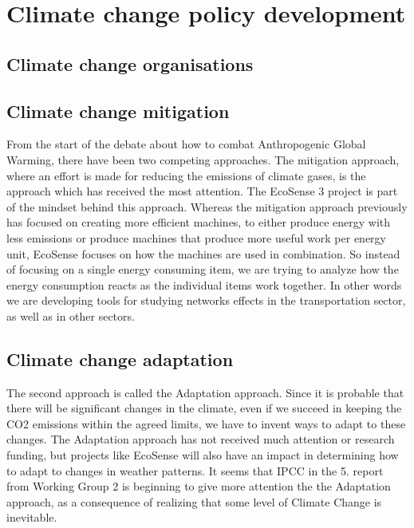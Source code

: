 \section{Climate change policy development}
\subsection{Climate change organisations}

\subsection{Climate change mitigation}From the start of the debate about how to combat Anthropogenic Global Warming, there have been two competing approaches. The mitigation approach, where an effort is made for reducing the emissions of climate gases, is the approach which has received the most attention. The EcoSense 3 project is part of the mindset behind this approach. Whereas the mitigation approach previously has focused on creating more efficient machines, to either produce energy with less emissions or produce machines that produce more useful work per energy unit, EcoSense focuses on how the machines are used in combination. So instead of focusing on a single energy consuming item, we are trying to analyze how the energy consumption reacts as the individual items work together. In other words we are developing tools for studying networks effects in the transportation sector, as well as in other sectors.


\subsection{Climate change adaptation}
The second approach is called the Adaptation approach. Since it is probable that there will be significant changes in the climate, even if we succeed in keeping the CO2 emissions within the agreed limits, we have to invent ways to adapt to these changes. The Adaptation approach has not received much attention or research funding, but projects like EcoSense will also have an impact in determining how to adapt to changes in weather patterns. It seems that IPCC in the 5. report from Working Group 2 is beginning to give more attention the the Adaptation approach, as a consequence of realizing that some level of Climate Change is inevitable.


